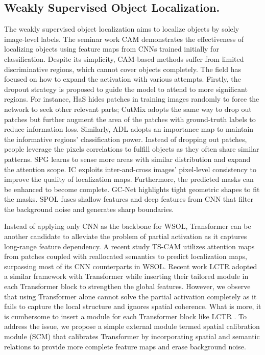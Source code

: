 \documentclass[runningheads]{llncs}
\begin{document}
\subsection{Weakly Supervised Object Localization.} The weakly supervised object localization aims to localize objects by solely image-level labels. The seminar work CAM \cite{zhou2015cnnlocalization} demonstrates the effectiveness of localizing objects using feature maps from CNNs trained initially for classification.
Despite its simplicity, CAM-based methods suffer from limited discriminative regions, which cannot cover objects completely. 
The field has focused on how to expand the activation with various attempts. 
Firstly, the dropout strategy is proposed to guide the model to attend to more significant regions. For instance, HaS \cite{singh2017hideandseek} hides patches in training images randomly to force the network to seek other relevant parts; CutMix \cite{DBLP:journals/corr/abs-1905-04899} adopts the same way to drop out patches but further augment the area of the patches with ground-truth labels to reduce information loss. Similarly, ADL \cite{choe2019attentionbased} adopts an importance map to maintain the informative regions' classification power. 
Instead of dropping out patches, people leverage the pixels correlations to fulfill objects as they often share similar patterns. SPG \cite{zhang2018selfproduced} learns to sense more areas with similar distribution and expand the attention scope. IC \cite{zhang2020interimage} exploits inter-and-cross images' pixel-level consistency to improve the quality of localization maps. 
Furthermore, the predicted masks can be enhanced to become complete. GC-Net \cite{lu2020geometry} highlights tight geometric shapes to fit the masks. SPOL \cite{Wei_2021_CVPR} fuses shallow features and deep features from CNN that filter the background noise and generates sharp boundaries. 

Instead of applying only CNN as the backbone for WSOL, Transformer can be another candidate to alleviate the problem of partial activation as it captures long-range feature dependency. A recent study TS-CAM \cite{gao2021tscam} utilizes attention maps from patches coupled with reallocated semantics to predict localization maps, surpassing most of its CNN counterparts in WSOL. 
Recent work LCTR \cite{chen2022lctr} adopted a similar framework with Transformer while inserting their tailored module in each Transformer block to strengthen the global features. 
However, we observe that using Transformer alone cannot solve the partial activation completely as it fails to capture the local structure and ignores spatial coherence. What is more, it is cumbersome to insert a module for each Transformer block like LCTR \cite{chen2022lctr}.
To address the issue, we propose a simple external module termed spatial calibration module (SCM) that calibrates Transformer by incorporating spatial and semantic relations to provide more complete feature maps and erase background noise. 
 
\end{document}
